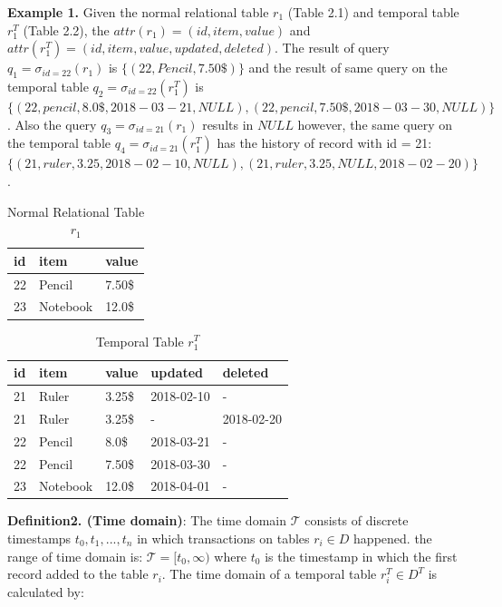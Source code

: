 \textbf{Example 1.} Given the normal relational table $r_1$ (Table 2.1) and temporal table $r_1^T$ (Table 2.2), the $attr(r_1) = (id, item, value)$ and $attr(r_1^T)= (id, item, value, updated, deleted)$. The result of query $q_1 = \sigma_{id = 22}(r_1)$ is $\{(22,Pencil,7.50\$)\}$ and the result of same query on the temporal table $q_2 = \sigma_{id = 22}(r_1^T)$ is $\{(22,pencil,8.0\$,2018-03-21,NULL),(22,pencil,7.50\$,2018-03-30,NULL)\}$. Also the query $q_3 = \sigma_{id = 21}(r_1)$ results in $NULL$ however, the same query on the temporal table $q_4 = \sigma_{id = 21}(r_1^T)$ has the history of record with id = 21: $\{(21,ruler,3.25,2018-02-10,NULL),(21,ruler,3.25,NULL,2018-02-20)\}$.
\begin{center}

\begin{table}[t]
	\centering
	\caption{Normal Relational Table $r_1$}
	\begin{tabular}{p{4cm}p{4cm}p{4cm}}
		\hline
		id & item      & value  \\ \hline
		22 & Pencil    & 7.50\$ \\
		23 & Notebook & 12.0\$   \\ \hline
	\end{tabular}
\end{table}

\begin{table}[t]
	\centering
	\caption{Temporal Table $r_1^T$}
	\begin{tabular}{p{1cm}p{2cm}p{3cm}p{3cm}p{2cm}}
		\hline
		id & item      & value  & updated  & deleted\\ \hline
		21 & Ruler    & 3.25\$  & 2018-02-10  &  - \\  
		21 & Ruler    & 3.25\$  & -  &  2018-02-20 \\
		22 & Pencil    & 8.0\$  & 2018-03-21  &  - \\
		22 & Pencil    & 7.50\$  & 2018-03-30  &  -\\
		23 & Notebook & 12.0\$  & 2018-04-01 & - \\ \hline
	\end{tabular}
\end{table} 
\end{center}

\textbf{Definition2. (Time domain)}: 
The time domain $\mathcal{T}$ consists of discrete timestamps $t_0,t_1,...,t_n$ in which transactions on tables $r_i \in D$ happened. the range of time domain is: $\mathcal{T} = [t_0, \infty)$ where $t_0$ is the timestamp in which the first record added to the table $r_i$.
The time domain of a temporal table $r_i^T \in D^T $ is calculated by:

